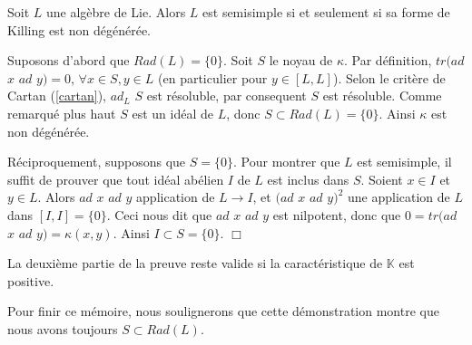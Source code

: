 \documentclass[a4paper,openany,12pt]{report}
\newcommand{\KK}{\mathbb{K}}
\theoremstyle{break}
{\theorembodyfont{\upshape}
\newtheorem*{rmq}{Remarque :}
\newtheorem*{prv}{Preuve :}
\newtheorem*{ex}{Exemples :}
\newtheorem*{exe}{Exemple : }
\newtheorem*{nota}{Notation :}
\newtheorem*{dem}{D\'emonstration :}}
\begin{document}
\begin{thm}
\quad Soit $L$ une algèbre de Lie. Alors $L$ est semisimple si et seulement si sa forme de Killing est non dégénérée. 
\end{thm}

\begin{dem}
\quad Suposons d'abord que $Rad(L) = \{0\}$. Soit $S$ le noyau de $\kappa$. Par définition, $tr(ad$ $x$ $ad$ $y)=0$, $\forall x \in S,y \in L$ (en particulier pour $y \in [L,L]$). Selon le critère de Cartan (\ref{cartan}), $ad_L$ $S$ est résoluble, par consequent $S$ est résoluble. Comme remarqué plus haut $S$ est un idéal de $L$, donc $S \subset Rad(L) = \{0\}$. Ainsi $\kappa$ est non dégénérée. 

Réciproquement, supposons que $S = \{0 \}$. Pour montrer que $L$ est semisimple, il suffit de prouver que tout idéal abélien $I$ de $L$ est inclus dans $S$. Soient $x \in I$ et $y \in L$. Alors $ad$ $x$ $ad$ $y$ application de $L \to I$, et $(ad$ $x$ $ad$ $y)^2$ une application de $L$ dans $[I,I] =\{0\}$. Ceci nous dit que $ad$ $x$ $ad$ $y$ est nilpotent, donc que $0 = tr(ad$ $x$ $ad$ $y)= \kappa(x,y)$. Ainsi $I \subset S = \{0\}$. $\Box$
\end{dem}

\begin{rmq}
\quad La deuxième partie de la preuve reste valide  si la caractéristique de $\KK$ est positive.
\end{rmq}

Pour finir ce mémoire, nous soulignerons que cette démonstration montre que nous avons toujours $S \subset Rad(L)$. 
\end{document}
